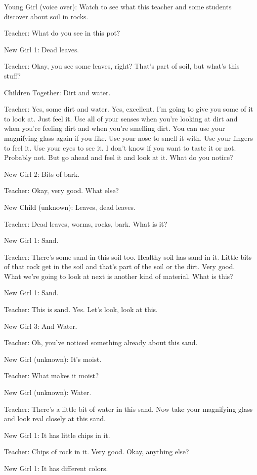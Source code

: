 Young Girl (voice over): Watch to see what this teacher and some students discover about soil in rocks.

Teacher: What do you see in this pot?

New Girl 1: Dead leaves.

Teacher: Okay, you see some leaves, right? That's part of soil, but what's this stuff?

Children Together: Dirt and water.

Teacher: Yes, some dirt and water. Yes, excellent. I'm going to give you some of it to look at. Just feel it. Use all of your senses when you're looking at dirt and when you're feeling dirt and when you're smelling dirt. You can use your magnifying glass again if you like. Use your nose to smell it with. Use your fingers to feel it. Use your eyes to see it. I don't know if you want to taste it or not. Probably not. But go ahead and feel it and look at it. What do you notice?

New Girl 2: Bits of bark.

Teacher: Okay, very good. What else?

New Child (unknown): Leaves, dead leaves.

Teacher: Dead leaves, worms, rocks, bark. What is it?

New Girl 1: Sand.

Teacher: There's some sand in this soil too. Healthy soil has sand in it. Little bits of that rock get in the soil and that's part of the soil or the dirt. Very good. What we're going to look at next is another kind of material. What is this?

New Girl 1: Sand.

Teacher: This is sand. Yes. Let's look, look at this.

New Girl 3: And Water.

Teacher: Oh, you've noticed something already about this sand.

New Girl (unknown): It's moist.

Teacher: What makes it moist?

New Girl (unknown): Water.

Teacher: There's a little bit of water in this sand. Now take your magnifying glass and look real closely at this sand.

New Girl 1: It has little chips in it.

Teacher: Chips of rock in it. Very good. Okay, anything else?

New Girl 1: It has different colors.

